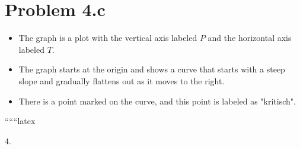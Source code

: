 \section*{Problem 4.c}

\begin{itemize}
    \item The graph is a plot with the vertical axis labeled \( P \) and the horizontal axis labeled \( T \).
    \item The graph starts at the origin and shows a curve that starts with a steep slope and gradually flattens out as it moves to the right.
    \item There is a point marked on the curve, and this point is labeled as "kritisch".
\end{itemize}

``````latex

4.